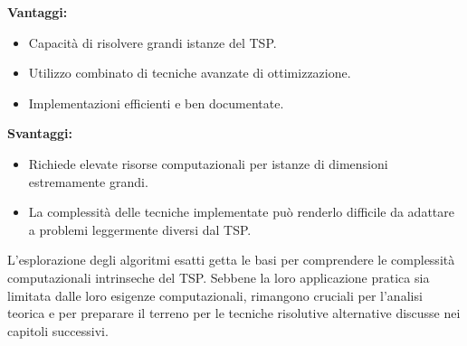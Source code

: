 \textbf{Vantaggi:}
\begin{itemize}
    \item Capacità di risolvere grandi istanze del \Gls{TSP}.
    \item Utilizzo combinato di tecniche avanzate di ottimizzazione.
    \item Implementazioni efficienti e ben documentate.
\end{itemize}

\textbf{Svantaggi:}
\begin{itemize}
    \item Richiede elevate risorse computazionali per istanze di dimensioni estremamente grandi.
    \item La complessità delle tecniche implementate può renderlo difficile da adattare a problemi leggermente diversi dal \Gls{TSP}.
\end{itemize}


L'esplorazione degli algoritmi esatti getta le basi per comprendere le complessità computazionali intrinseche del \Gls{TSP}. Sebbene la loro applicazione pratica sia limitata dalle loro esigenze computazionali, rimangono cruciali per l'analisi teorica e per preparare il terreno per le tecniche risolutive alternative discusse nei capitoli successivi.

